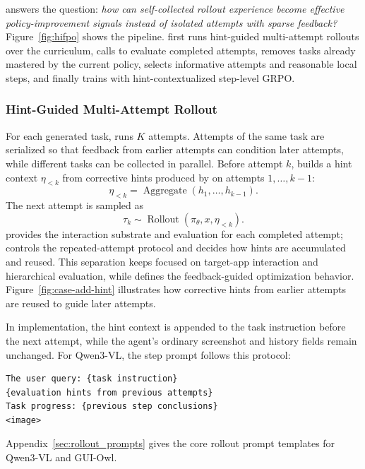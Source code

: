 \hifpo answers the question: \emph{how can self-collected rollout experience become effective policy-improvement signals instead of isolated attempts with sparse feedback?} Figure~\ref{fig:hifpo} shows the pipeline. \hifpo first runs hint-guided multi-attempt rollouts over the \mobilegym curriculum, calls \critic to evaluate completed attempts, removes tasks already mastered by the current policy, selects informative attempts and reasonable local steps, and finally trains with hint-contextualized step-level GRPO.

\subsubsection{Hint-Guided Multi-Attempt Rollout}

For each generated task, \hifpo runs $K$ attempts. Attempts of the same task are serialized so that feedback from earlier attempts can condition later attempts, while different tasks can be collected in parallel. Before attempt $k$, \hifpo builds a hint context $\eta_{<k}$ from corrective hints produced by \critic on attempts $1,\ldots,k-1$:
\begin{equation}
\label{eq:hint-context}
    \eta_{<k}=\operatorname{Aggregate}(h_1,\ldots,h_{k-1}).
\end{equation}
The next attempt is sampled as
\begin{equation}
\label{eq:hifpo-rollout}
    \tau_k\sim \operatorname{Rollout}(\pi_\theta,x,\eta_{<k}).
\end{equation}
\mobilegym provides the interaction substrate and \critic evaluation for each completed attempt; \hifpo controls the repeated-attempt protocol and decides how hints are accumulated and reused. This separation keeps \mobilegym focused on target-app interaction and hierarchical evaluation, while \hifpo defines the feedback-guided optimization behavior.
Figure~\ref{fig:case-add-hint} illustrates how corrective hints from earlier attempts are reused to guide later attempts.


In implementation, the hint context is appended to the task instruction before the next attempt, while the agent's ordinary screenshot and history fields remain unchanged. For Qwen3-VL, the step prompt follows this protocol:
\begin{lstlisting}[basicstyle=\ttfamily\small,breaklines=true,columns=fullflexible]
The user query: {task instruction}
{evaluation hints from previous attempts}
Task progress: {previous step conclusions}
<image>
\end{lstlisting}
Appendix~\ref{sec:rollout_prompts} gives the core rollout prompt templates for Qwen3-VL and GUI-Owl.


